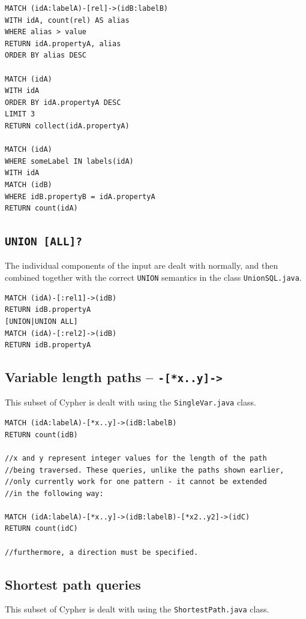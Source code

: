 \documentclass[letterpaper]{ltxdoc}
\begin{document}
\medskip

\begin{lstlisting}[language = Cypher]
MATCH (idA:labelA)-[rel]->(idB:labelB)
WITH idA, count(rel) AS alias
WHERE alias > value
RETURN idA.propertyA, alias
ORDER BY alias DESC

MATCH (idA)
WITH idA
ORDER BY idA.propertyA DESC
LIMIT 3
RETURN collect(idA.propertyA)

MATCH (idA)
WHERE someLabel IN labels(idA)
WITH idA
MATCH (idB)
WHERE idB.propertyB = idA.propertyA
RETURN count(idA)
\end{lstlisting}

\subsection*{\texttt{UNION [ALL]?}}
The individual components of the input are dealt with normally, and then combined together with the correct \texttt{UNION} semantics in the class \texttt{UnionSQL.java}.

\medskip

\begin{lstlisting}[language = Cypher]
MATCH (idA)-[:rel1]->(idB)
RETURN idB.propertyA
[UNION|UNION ALL]
MATCH (idA)-[:rel2]->(idB)
RETURN idB.propertyA
\end{lstlisting}

\newpage

\subsection*{Variable length paths -- \texttt{-[*x..y]->}}
This subset of Cypher is dealt with using the \texttt{SingleVar.java} class.

\medskip

\begin{lstlisting}[language = Cypher]
MATCH (idA:labelA)-[*x..y]->(idB:labelB)
RETURN count(idB)

//x and y represent integer values for the length of the path
//being traversed. These queries, unlike the paths shown earlier,
//only currently work for one pattern - it cannot be extended
//in the following way:

MATCH (idA:labelA)-[*x..y]->(idB:labelB)-[*x2..y2]->(idC)
RETURN count(idC)

//furthermore, a direction must be specified.
\end{lstlisting}

\subsection*{Shortest path queries}
This subset of Cypher is dealt with using the \texttt{ShortestPath.java} class.
\end{document}
